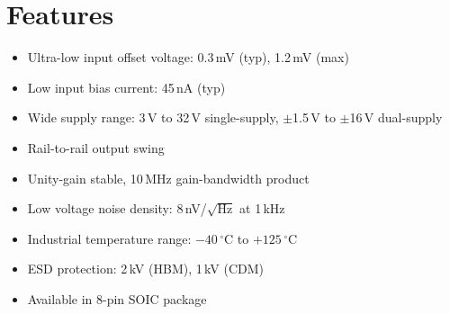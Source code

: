 \section{Features}
\begin{itemize}
  \item Ultra-low input offset voltage: 0.3\,mV (typ), 1.2\,mV (max)
  \item Low input bias current: 45\,nA (typ)
  \item Wide supply range: 3\,V to 32\,V single-supply, $\pm$1.5\,V to $\pm$16\,V dual-supply
  \item Rail-to-rail output swing
  \item Unity-gain stable, 10\,MHz gain-bandwidth product
  \item Low voltage noise density: 8\,nV/$\sqrt{\text{Hz}}$ at 1\,kHz
  \item Industrial temperature range: $-40\,^{\circ}$C to $+125\,^{\circ}$C
  \item ESD protection: 2\,kV (HBM), 1\,kV (CDM)
  \item Available in 8-pin SOIC package
\end{itemize}

